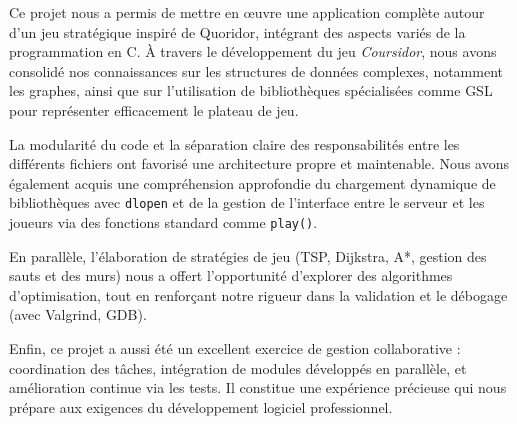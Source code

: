 \documentclass[a4paper,12pt]{article}
\begin{document}
Ce projet nous a permis de mettre en œuvre une application complète autour d’un jeu stratégique inspiré de Quoridor, intégrant des aspects variés de la programmation en C. À travers le développement du jeu \textit{Coursidor}, nous avons consolidé nos connaissances sur les structures de données complexes, notamment les graphes, ainsi que sur l'utilisation de bibliothèques spécialisées comme GSL pour représenter efficacement le plateau de jeu.

La modularité du code et la séparation claire des responsabilités entre les différents fichiers ont favorisé une architecture propre et maintenable. Nous avons également acquis une compréhension approfondie du chargement dynamique de bibliothèques avec \texttt{dlopen} et de la gestion de l’interface entre le serveur et les joueurs via des fonctions standard comme \texttt{play()}.

En parallèle, l'élaboration de stratégies de jeu (TSP, Dijkstra, A*, gestion des sauts et des murs) nous a offert l'opportunité d’explorer des algorithmes d’optimisation, tout en renforçant notre rigueur dans la validation et le débogage (avec Valgrind, GDB).

Enfin, ce projet a aussi été un excellent exercice de gestion collaborative : coordination des tâches, intégration de modules développés en parallèle, et amélioration continue via les tests. Il constitue une expérience précieuse qui nous prépare aux exigences du développement logiciel professionnel.
\end{document}
